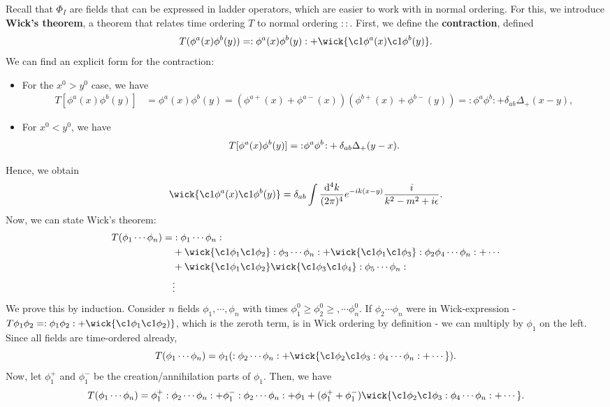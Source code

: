 \documentclass{article}
\begin{document}
Recall that $\Phi_I$ are fields that can be expressed in ladder operators, which are easier to work with in normal ordering. For this, we introduce \textbf{Wick's theorem}, a theorem that relates time ordering $T$ to normal ordering $::$. First, we define the \textbf{contraction}, defined 
$$T(\phi^a(x)\phi^b(y))=:\phi^a(x)\phi^b(y):+\wick{\c1\phi^a(x)\c1\phi^b(y)}.$$
We can find an explicit form for the contraction:
\begin{itemize}
    \item For the $x^0>y^0$ case, we have 
    \begin{align*}
        T[\phi^a(x)\phi^b(y)]&=\phi^a(x)\phi^b(y)=\left(\phi^{a+}(x)+\phi^{a-}(x)\right)\left(\phi^{b+}(x)+\phi^{b-}(y)\right)=:\phi^a\phi^b:+\delta_{ab}\Delta_+(x-y),
    \end{align*}
    \item For $x^0<y^0$, we have 
    $$T[\phi^a(x)\phi^b(y)]={:}\mkern1mu\phi^a\phi^b\mkern1.6mu{:}+\delta_{ab}\Delta_+(y-x).$$
\end{itemize}
Hence, we obtain
$$\wick{\c1\phi^a(x)\c1\phi^b(y)}=\delta_{ab}\int\frac{\dd^4k}{(2\pi)^4}e^{-ik(x-y)}\frac{i}{k^2-m^2+i\epsilon}.$$
Now, we can state Wick's theorem:
\begin{align}
\begin{split}
    T(\phi_1\cdots\phi_n)=&:\phi_1\cdots\phi_n:\\
    &+\wick{\c1\phi_1\c1\phi_2}:\phi_3\cdots\phi_n:+\wick{\c1\phi_1\c1\phi_3}:\phi_2\phi_4\cdots\phi_n:+\cdots\\
    &+\wick{\c1\phi_1\c1\phi_2}\wick{\c1\phi_3\c1\phi_4}:\phi_5\cdots\phi_n:\\
    &\vdots
\end{split}
\end{align}
We prove this by induction. Consider $n$ fields $\phi_1,\cdots,\phi_n$ with times $\phi_1^0\ge \phi_2^0\ge,\cdots\phi_n^0$. If $\phi_2\cdots\phi_n$ were in Wick-expression - $T\phi_1\phi_2=:\phi_1\phi_2:+\wick{\c1\phi_1\c1\phi_2)}$, which is the zeroth term, is in Wick ordering by definition - we can multiply by $\phi_1$ on the left. Since all fields are time-ordered already,
$$T(\phi_1\cdots\phi_n)=\phi_1(:\phi_2\cdots\phi_n:+\wick{\c1\phi_2\c1\phi_3:\phi_4\cdots\phi_n:+\cdots}).$$
Now, let $\phi_1^+$ and $\phi_1^-$ be the creation/annihilation parts of $\phi_1$. Then, we have 
\begin{align*}
    T(\phi_1\cdots\phi_n)=\phi_1^+:\phi_2\cdots\phi_n:+\phi_1^-:\phi_2\cdots\phi_n:+\phi_1+(\phi^+_1+\phi^-_1)\wick{\c1\phi_2\c1\phi_3:\phi_4\cdots\phi_n:+\cdots}.
\end{align*}
\end{document}
